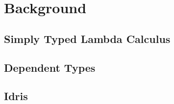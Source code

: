\section{Background}
\label{sec:background}

\subsection{Simply Typed Lambda Calculus}

\subsection{Dependent Types}

\subsection{Idris}
